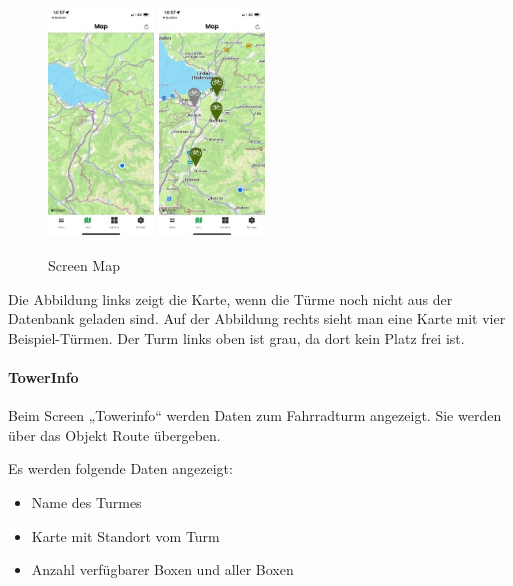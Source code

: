 \begin{figure}[H]
  \centering
  \includegraphics[width=0.25\textwidth]{images/app-screenshots/screenmapa.jpg}
  \includegraphics[width=0.25\textwidth]{images/app-screenshots/screenmapb.jpg}
  \caption{Screen Map}
  \label{fig:screenmap}
\end{figure}

Die Abbildung links zeigt die Karte, wenn die Türme noch nicht aus der Datenbank geladen sind.
Auf der Abbildung rechts sieht man eine Karte mit vier Beispiel-Türmen. Der Turm links oben ist grau, da dort kein Platz frei ist.

\bigskip


\paragraph{TowerInfo}Beim Screen „Towerinfo“ werden Daten zum Fahrradturm angezeigt. Sie werden über das Objekt Route übergeben.

\medskip


\noindent Es werden folgende Daten angezeigt:
\begin{itemize}
  \item Name des Turmes
  \item Karte mit Standort vom Turm
  \item Anzahl verfügbarer Boxen und aller Boxen
\end{itemize}

